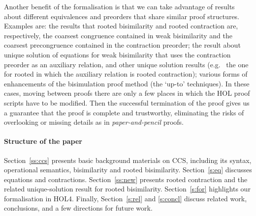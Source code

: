 Another benefit of the formalisation is 
that we can take advantage of results about different 
equivalences and preorders that share similar proof structures. 
Examples are: the results that rooted bisimilarity and rooted contraction are,
respectively, the coarsest congruence contained in weak bisimilarity 
and the coarsest precongruence contained in the contraction preorder; 
the result about unique solution of equations for weak bisimilarity that uses the
contraction preorder as an auxiliary relation, and other unique solution results (e.g.~%
the one for rooted in which
the auxiliary relation is rooted contraction); various forms of enhancements of the bisimulation
proof method (the `up-to' techniques).
In these cases, moving between proofs there are only a few places in
which the HOL proof scripts have to be modified.
Then the successful termination of the proof gives us a guarantee that the proof is
complete and trustworthy, eliminating the risks 
of overlooking or missing details as in \emph{paper-and-pencil} proofs.

\paragraph{Structure of the paper}

Section~\ref{ss:ccs} presents basic background materials on CCS,
including its syntax, operational semantics, bisimilarity and rooted
bisimilarity.
Section~\ref{s:eq} discusses equations and contractions.
Section~\ref{ss:new} presents rooted contraction and the related
unique-solution result for rooted bisimilarity.
Section~\ref{s:for} highlights our formalisation in HOL4.
Finally,  Section~\ref{s:rel} and \ref{s:concl} discuss related work,
conclusions, and a few directions for future work.

